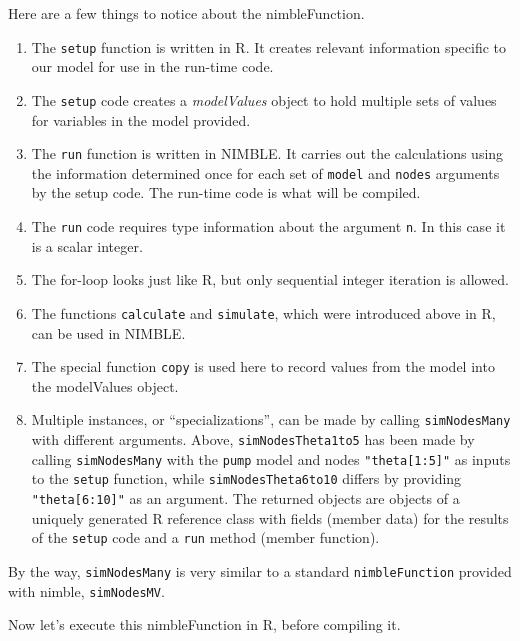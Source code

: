 \documentclass[12pt,oneside]{book}\usepackage[]{graphicx}\usepackage[]{color}
\def\cd#1{\texttt{#1}}
\def\nm#1{\textit{#1}}
\begin{document}
Here are a few things to notice about the nimbleFunction.
\begin{enumerate}
\item The \cd{setup} function is written in R.  It creates relevant
  information specific to our model for use in the run-time code.  
\item The \cd{setup} code creates a \nm{modelValues} object to hold multiple sets of
  values for variables  in the model provided.
\item The \cd{run} function is written in NIMBLE.  It carries out the
  calculations using the information determined once for each set of
  \cd{model} and \cd{nodes} arguments by the setup
  code. The run-time code is what will be compiled.
\item The \cd{run} code requires type information about the argument
  \cd{n}.  In this case it is a scalar integer.  
\item The for-loop looks just like R, but only sequential integer
  iteration is allowed.
\item The functions \cd{calculate} and \cd{simulate}, which were
  introduced above in R, can be used in NIMBLE.
\item The special function \cd{copy} is used here to record values
  from the model into the modelValues object.  
\item Multiple instances, or ``specializations'', can be made by
  calling \cd{simNodesMany} with different arguments.  Above, \cd{simNodesTheta1to5} has
  been made by calling \cd{simNodesMany} with the \cd{pump} model and
  nodes \cd{"theta[1:5]"} as inputs to
  the \cd{setup} function, while \cd{simNodesTheta6to10} differs by
  providing \cd{"theta[6:10]"} as an argument.  The returned objects
  are objects of a uniquely
  generated R reference class with fields (member data) for the results of the
  \cd{setup} code and a \cd{run} method (member function). 
\end{enumerate}

By the way, \cd{simNodesMany} is very similar to a standard
\cd{nimbleFunction} provided with nimble, \cd{simNodesMV}.

Now let's execute this nimbleFunction in R, before compiling it.
\end{document}
